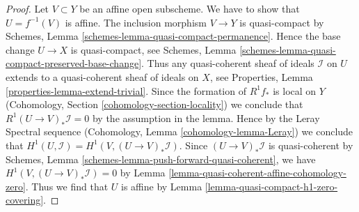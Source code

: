 \documentclass[10pt,a4paper]{amsart}
\theoremstyle{plain}
\theoremstyle{definition}
\theoremstyle{remark}
\numberwithin{equation}{subsection}
\begin{document}
\begin{proof}
Let $V \subset Y$ be an affine open subscheme. We have to show that
$U = f^{-1}(V)$ is affine. The inclusion morphism $V \to Y$ is quasi-compact
by Schemes, Lemma \ref{schemes-lemma-quasi-compact-permanence}.
Hence the base change $U \to X$ is quasi-compact, see
Schemes, Lemma \ref{schemes-lemma-quasi-compact-preserved-base-change}.
Thus any quasi-coherent sheaf of ideals $\mathcal{I}$ on $U$
extends to a quasi-coherent sheaf of ideals on $X$, see
Properties, Lemma \ref{properties-lemma-extend-trivial}.
Since the formation of $R^1f_*$ is local on $Y$
(Cohomology, Section \ref{cohomology-section-locality})
we conclude that $R^1(U \to V)_*\mathcal{I} = 0$ by the assumption
in the lemma. Hence by the Leray Spectral sequence
(Cohomology, Lemma \ref{cohomology-lemma-Leray})
we conclude that $H^1(U, \mathcal{I}) = H^1(V, (U \to V)_*\mathcal{I})$.
Since $(U \to V)_*\mathcal{I}$ is quasi-coherent by
Schemes, Lemma \ref{schemes-lemma-push-forward-quasi-coherent}, we have
$H^1(V, (U \to V)_*\mathcal{I}) = 0$ by
Lemma \ref{lemma-quasi-coherent-affine-cohomology-zero}.
Thus we find that $U$ is affine by
Lemma \ref{lemma-quasi-compact-h1-zero-covering}.
\end{proof}
\end{document}
